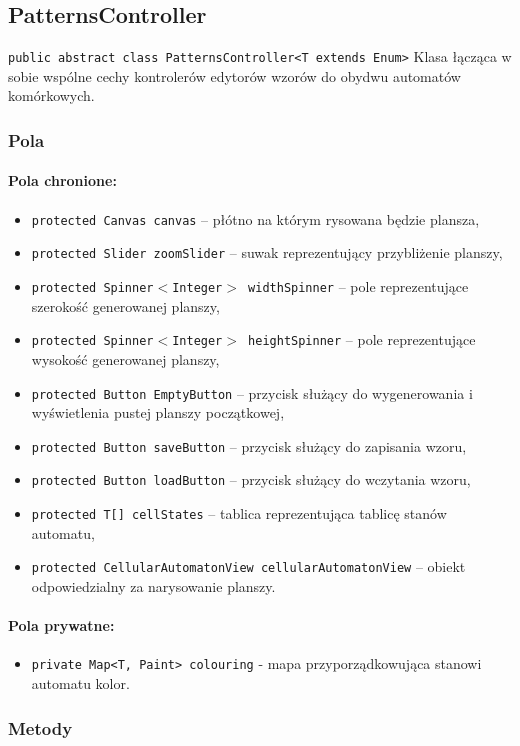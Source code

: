 \documentclass{report}
\begin{document}
\subsection{PatternsController}
\texttt{public abstract class PatternsController<T extends Enum>}
Klasa łącząca w sobie wspólne cechy kontrolerów edytorów wzorów do obydwu automatów komórkowych.
\subsubsection{Pola}
\paragraph{Pola chronione:}
\begin{itemize}
	\item \texttt{protected Canvas canvas} -- płótno na którym rysowana będzie plansza,
	\item \texttt{protected Slider zoomSlider} -- suwak reprezentujący przybliżenie planszy,
	\item \texttt{protected Spinner$<$Integer$>$  widthSpinner} -- pole reprezentujące szerokość generowanej planszy,
	\item \texttt{protected Spinner$<$Integer$>$ heightSpinner} -- pole reprezentujące wysokość generowanej planszy,
	\item \texttt{protected Button EmptyButton} -- przycisk służący do wygenerowania i wyświetlenia pustej planszy początkowej,
	\item \texttt{protected Button saveButton} -- przycisk służący do zapisania wzoru,
	\item \texttt{protected Button loadButton} -- przycisk służący do wczytania wzoru,
	\item \texttt{protected T[] cellStates} -- tablica reprezentująca tablicę stanów automatu,
	\item \texttt{protected CellularAutomatonView cellularAutomatonView} -- obiekt odpowiedzialny za narysowanie planszy.
\end{itemize}

\paragraph{Pola prywatne:}
\begin{itemize}
	\item \texttt{private Map<T, Paint> colouring} - mapa przyporządkowująca stanowi automatu kolor.
\end{itemize}
\subsubsection{Metody}
\end{document}
